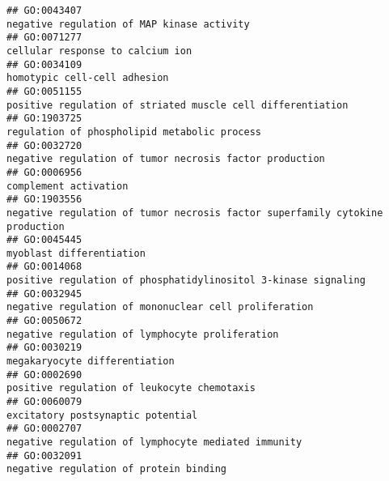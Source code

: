 \documentclass[
]{article}
\begin{document}
\begin{verbatim}
## GO:0043407                                                                                                       negative regulation of MAP kinase activity
## GO:0071277                                                                                                                 cellular response to calcium ion
## GO:0034109                                                                                                                     homotypic cell-cell adhesion
## GO:0051155                                                                                      positive regulation of striated muscle cell differentiation
## GO:1903725                                                                                                     regulation of phospholipid metabolic process
## GO:0032720                                                                                          negative regulation of tumor necrosis factor production
## GO:0006956                                                                                                                            complement activation
## GO:1903556                                                                     negative regulation of tumor necrosis factor superfamily cytokine production
## GO:0045445                                                                                                                         myoblast differentiation
## GO:0014068                                                                                   positive regulation of phosphatidylinositol 3-kinase signaling
## GO:0032945                                                                                            negative regulation of mononuclear cell proliferation
## GO:0050672                                                                                                  negative regulation of lymphocyte proliferation
## GO:0030219                                                                                                                    megakaryocyte differentiation
## GO:0002690                                                                                                      positive regulation of leukocyte chemotaxis
## GO:0060079                                                                                                                excitatory postsynaptic potential
## GO:0002707                                                                                              negative regulation of lymphocyte mediated immunity
## GO:0032091                                                                                                           negative regulation of protein binding

\end{verbatim}
\end{document}
